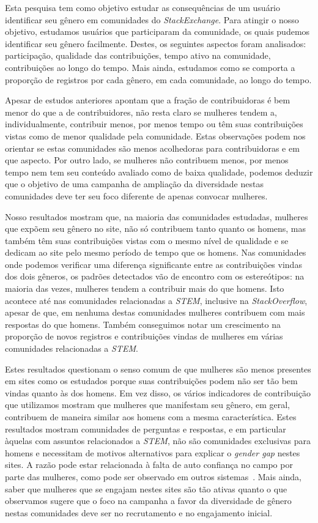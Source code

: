 Esta pesquisa tem como objetivo estudar as consequências de um usuário identificar seu gênero em comunidades do \emph{StackExchange}. Para atingir o nosso objetivo, estudamos usuários que participaram da comunidade, os quais pudemos identificar seu gênero facilmente. Destes, os seguintes aspectos foram analisados: participação, qualidade das contribuições, tempo ativo na comunidade, contribuições ao longo do tempo. Mais ainda, estudamos como se comporta a proporção de registros por cada gênero, em cada comunidade, ao longo do tempo.

Apesar de estudos anteriores apontam que a fração de contribuidoras é bem menor do que a de contribuidores, não resta claro se mulheres tendem a, individualmente, contribuir menos, por menos tempo ou têm suas contribuições vistas como de menor qualidade pela comunidade. Estas observações podem nos orientar se estas comunidades são menos acolhedoras para contribuidoras e em que aspecto. Por outro lado, se mulheres não contribuem menos, por menos tempo nem tem seu conteúdo avaliado como de baixa qualidade, podemos deduzir que o objetivo de uma campanha de ampliação da diversidade nestas comunidades deve ter seu foco diferente de apenas convocar mulheres.


Nosso resultados mostram que, na maioria das comunidades estudadas, mulheres que expõem seu gênero no site, não só contribuem tanto quanto os homens, mas também têm suas contribuições vistas com o mesmo nível de qualidade e se dedicam ao site pelo mesmo período de tempo que os homens. Nas comunidades onde podemos verificar uma diferença significante entre as contribuições vindas dos dois gêneros, os padrões detectados vão de encontro com os estereótipos: na maioria das vezes, mulheres tendem a contribuir mais do que homens. Isto acontece até nas comunidades relacionadas a \emph{STEM}, inclusive na \emph{StackOverflow}, apesar de que, em nenhuma destas comunidades mulheres contribuem com mais respostas do que homens. Também conseguimos notar um crescimento na proporção de novos registros e contribuições vindas de mulheres em várias comunidades relacionadas a \emph{STEM}.

Estes resultados questionam o senso comum de que mulheres são menos presentes em sites como os estudados porque suas contribuições podem não ser tão bem vindas quanto às dos homens. Em vez disso, os vários indicadores de contribuição que utilizamos mostram que mulheres que manifestam seu gênero, em geral, contribuem de maneira similar aos homens com a mesma característica. Estes resultados mostram comunidades de perguntas e respostas, e em particular àquelas com assuntos relacionados a \emph{STEM}, não são comunidades exclusivas para homens e necessitam de motivos alternativos para explicar o \textit{gender gap} nestes sites. A razão pode estar relacionada à falta de auto confiança no campo por parte das mulheres, como pode ser observado em outros sistemas~\cite{piazza:report}. Mais ainda, saber que mulheres que se engajam nestes sites são tão ativas quanto o que observamos sugere que o foco na campanha a favor da diversidade de gênero nestas comunidades deve ser no recrutamento e no engajamento inicial.


